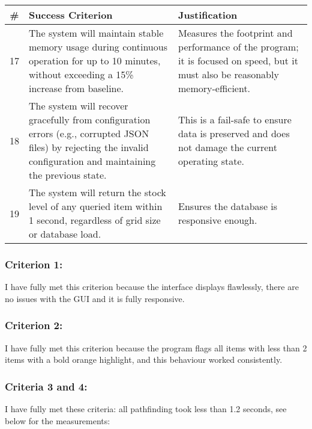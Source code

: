 		\newpage
		\begin{table}[htbp]
		\centering
		\begin{tabularx}{\textwidth}{|c|X|X|}
		\hline
		\textbf{\#} & \textbf{Success Criterion} & \textbf{Justification} \\
		\hline
		17 & The system will maintain stable memory usage during continuous operation for up to 10 minutes, without exceeding a 15\% increase from baseline. & Measures the footprint and performance of the program; it is focused on speed, but it must also be reasonably memory-efficient. \\
		\hline
		18 & The system will recover gracefully from configuration errors (e.g., corrupted JSON files) by rejecting the invalid configuration and maintaining the previous state. & This is a fail-safe to ensure data is preserved and does not damage the current operating state. \\
		\hline
		19 & The system will return the stock level of any queried item within 1 second, regardless of grid size or database load. & Ensures the database is responsive enough. \\
		\hline
	\end{tabularx}
\end{table}

\subsubsection{Criterion 1:}
I have fully met this criterion because the interface displays flawlessly, there are no issues with the GUI and it is fully responsive.

\subsubsection{Criterion 2:}
I have fully met this criterion because the program flags all items with less than 2 items with a bold orange highlight, and this behaviour worked consistently.

\subsubsection{Criteria 3 and 4:}

I have fully met these criteria: all pathfinding took less than 1.2 seconds, see below for the measurements:

